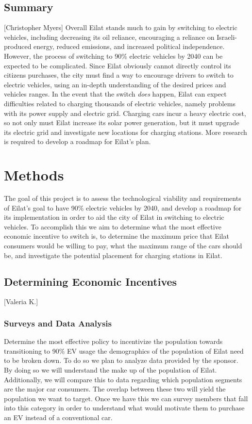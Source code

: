 \documentclass[12pt]{article}                         %
\begin{document}
\subsection{Summary}[Christopher Myers]
Overall Eilat stands much to gain by switching to electric vehicles, including decreasing its oil reliance, encouraging a reliance on Israeli-produced energy, reduced emissions, and increased political independence. However, the process of switching to 90\% electric vehicles by 2040 can be expected to be complicated. Since Eilat obviously cannot directly control its citizens purchases, the city must find a way to encourage drivers to switch to electric vehicles, using an in-depth understanding of the desired prices and vehicles ranges. In the event that the switch \textit{does} happen, Eilat can expect difficulties related to charging thousands of electric vehicles, namely problems with its power supply and electric grid. Charging cars incur a heavy electric cost, so not only must Eilat increase its solar power generation, but it must upgrade its electric grid and investigate new locations for charging stations. More research is required to develop a roadmap for Eilat's plan.

\newpage
\section{Methods}
The goal of this project is to assess the technological viability and requirements of Eilat's goal to have 90\% electric vehicles by 2040, and develop a roadmap for its implementation in order to aid the city of Eilat in switching to electric vehicles. To accomplish this we aim to determine what the most effective economic incentive to switch is, to determine the maximum price that Eilat consumers would be willing to pay, what the maximum range of the cars should be, and investigate the potential placement for charging stations in Eilat.


\subsection{Determining Economic Incentives}[Valeria K.]
\subsubsection{Surveys and Data Analysis}
Determine the most effective policy to incentivize the population towards transitioning to 90\% EV usage the demographics of the population of Eilat need to be broken down. To do so we plan to analyze data provided by the sponsor. By doing so we will understand the make up of the population of Eilat. Additionally, we will compare this to data regarding which population segments are the major car consumers. The overlap between these two will yield the population we want to target. Once we have this we can survey members that fall into this category in order to understand what would motivate them to purchase an EV instead of a conventional car.
\end{document}
